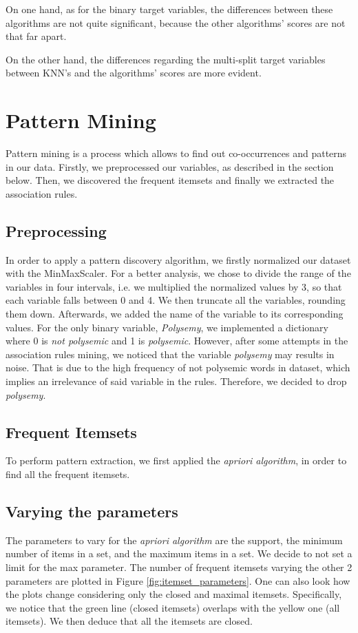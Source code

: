 \documentclass[a4paper,11pt,dvipsnames]{article}
\begin{document}
On one hand, as for the binary target variables, the differences between these algorithms are not quite significant, because the other algorithms' scores are not that far apart. 

On the other hand, the differences regarding the multi-split target variables between KNN's and the algorithms' scores are more evident.


\section{Pattern Mining}
Pattern mining is a process which allows to find out co-occurrences and patterns in our data. Firstly, we preprocessed our variables, as described in the section below. Then, we discovered the frequent itemsets and finally we extracted the association rules. 

\subsection{Preprocessing}
In order to apply a pattern discovery algorithm, we firstly normalized our dataset with the MinMaxScaler. For a better analysis, we chose to divide the range of the variables in four intervals, i.e. we  multiplied the normalized values by 3, so that each variable falls between 0 and 4. We then truncate all the variables, rounding them down. Afterwards, we added the name of the variable to its corresponding values. For the only binary variable, \textit{Polysemy}, we implemented a dictionary where 0 is \textit{not polysemic} and 1 is \textit{polysemic}. However, after some attempts in the association rules mining, we noticed that the variable \textit{polysemy} may results in noise. That is due to the high frequency of not polysemic words in dataset, which implies an irrelevance of said variable in the rules.
Therefore, we decided to drop \textit{polysemy}.

\subsection{Frequent Itemsets}
To perform pattern extraction, we first applied the \textit{apriori algorithm}, in order to find all the frequent itemsets.

\subsection{Varying the parameters}
The parameters to vary for the \textit{apriori algorithm} are the support, the minimum number of items in a set, and the maximum items in a set. We decide to not set a limit for the max parameter. The number of frequent itemsets varying the other 2 parameters are plotted in Figure \ref{fig:itemset_parameters}. One can also look how the plots change considering only the closed and maximal itemsets. Specifically, we notice that the green line (closed itemsets) overlaps with the yellow one (all itemsets). We then deduce that all the itemsets are closed.
\end{document}
